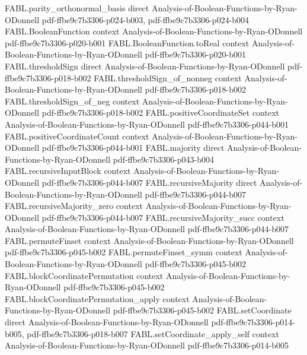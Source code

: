 \begin{theorem}
  {FABL.parity_orthonormal_basis}
  {direct}
  {Analysis-of-Boolean-Functions-by-Ryan-ODonnell}
  {pdf-ffbe9c7b3306-p024-b003,
    pdf-ffbe9c7b3306-p024-b004}
\proofstep
  {FABL.BooleanFunction}
  {context}
  {Analysis-of-Boolean-Functions-by-Ryan-ODonnell}
  {pdf-ffbe9c7b3306-p020-b001}
\proofstep
  {FABL.BooleanFunction.toReal}
  {context}
  {Analysis-of-Boolean-Functions-by-Ryan-ODonnell}
  {pdf-ffbe9c7b3306-p020-b001}
\proofstep
  {FABL.thresholdSign}
  {direct}
  {Analysis-of-Boolean-Functions-by-Ryan-ODonnell}
  {pdf-ffbe9c7b3306-p018-b002}
\proofstep
  {FABL.thresholdSign_of_nonneg}
  {context}
  {Analysis-of-Boolean-Functions-by-Ryan-ODonnell}
  {pdf-ffbe9c7b3306-p018-b002}
\proofstep
  {FABL.thresholdSign_of_neg}
  {context}
  {Analysis-of-Boolean-Functions-by-Ryan-ODonnell}
  {pdf-ffbe9c7b3306-p018-b002}
\proofstep
  {FABL.positiveCoordinateSet}
  {context}
  {Analysis-of-Boolean-Functions-by-Ryan-ODonnell}
  {pdf-ffbe9c7b3306-p044-b001}
\proofstep
  {FABL.positiveCoordinateCount}
  {context}
  {Analysis-of-Boolean-Functions-by-Ryan-ODonnell}
  {pdf-ffbe9c7b3306-p044-b001}
\proofstep
  {FABL.majority}
  {direct}
  {Analysis-of-Boolean-Functions-by-Ryan-ODonnell}
  {pdf-ffbe9c7b3306-p043-b004}
\proofstep
  {FABL.recursiveInputBlock}
  {context}
  {Analysis-of-Boolean-Functions-by-Ryan-ODonnell}
  {pdf-ffbe9c7b3306-p044-b007}
\proofstep
  {FABL.recursiveMajority}
  {direct}
  {Analysis-of-Boolean-Functions-by-Ryan-ODonnell}
  {pdf-ffbe9c7b3306-p044-b007}
\proofstep
  {FABL.recursiveMajority_zero}
  {context}
  {Analysis-of-Boolean-Functions-by-Ryan-ODonnell}
  {pdf-ffbe9c7b3306-p044-b007}
\proofstep
  {FABL.recursiveMajority_succ}
  {context}
  {Analysis-of-Boolean-Functions-by-Ryan-ODonnell}
  {pdf-ffbe9c7b3306-p044-b007}
\proofstep
  {FABL.permuteFinset}
  {context}
  {Analysis-of-Boolean-Functions-by-Ryan-ODonnell}
  {pdf-ffbe9c7b3306-p045-b002}
\proofstep
  {FABL.permuteFinset_symm}
  {context}
  {Analysis-of-Boolean-Functions-by-Ryan-ODonnell}
  {pdf-ffbe9c7b3306-p045-b002}
\proofstep
  {FABL.blockCoordinatePermutation}
  {context}
  {Analysis-of-Boolean-Functions-by-Ryan-ODonnell}
  {pdf-ffbe9c7b3306-p045-b002}
\proofstep
  {FABL.blockCoordinatePermutation_apply}
  {context}
  {Analysis-of-Boolean-Functions-by-Ryan-ODonnell}
  {pdf-ffbe9c7b3306-p045-b002}
\proofstep
  {FABL.setCoordinate}
  {direct}
  {Analysis-of-Boolean-Functions-by-Ryan-ODonnell}
  {pdf-ffbe9c7b3306-p014-b005,
    pdf-ffbe9c7b3306-p018-b007}
\proofstep
  {FABL.setCoordinate_apply_self}
  {context}
  {Analysis-of-Boolean-Functions-by-Ryan-ODonnell}
  {pdf-ffbe9c7b3306-p014-b005}

\end{theorem}
